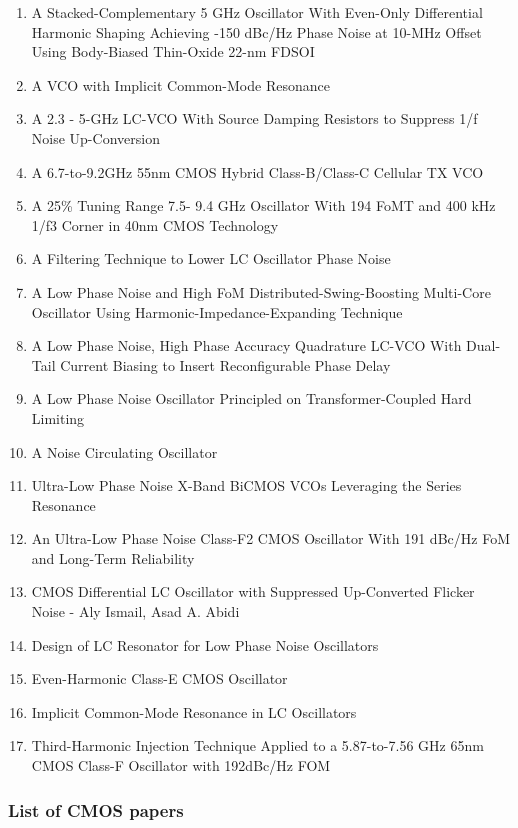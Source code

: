 \begin{enumerate}
	\item A Stacked-Complementary 5 GHz Oscillator With Even-Only Differential Harmonic Shaping Achieving -150 dBc/Hz Phase Noise at 10-MHz Offset Using Body-Biased Thin-Oxide 22-nm FDSOI
	\item A VCO with Implicit Common-Mode Resonance
	\item A 2.3 - 5-GHz LC-VCO With Source Damping Resistors to Suppress 1/f Noise Up-Conversion
	\item A 6.7-to-9.2GHz 55nm CMOS Hybrid Class-B/Class-C Cellular TX VCO
	\item A 25\% Tuning Range 7.5- 9.4 GHz Oscillator With 194 FoMT and 400 kHz 1/f3 Corner in 40nm CMOS Technology
	\item A Filtering Technique to Lower LC Oscillator Phase Noise
	\item A Low Phase Noise and High FoM Distributed-Swing-Boosting Multi-Core Oscillator Using Harmonic-Impedance-Expanding Technique
	\item A Low Phase Noise, High Phase Accuracy Quadrature LC-VCO With Dual-Tail Current Biasing to Insert Reconfigurable Phase Delay
	\item A Low Phase Noise Oscillator Principled on Transformer-Coupled Hard Limiting
	\item A Noise Circulating Oscillator
	\item Ultra-Low Phase Noise X-Band BiCMOS VCOs Leveraging the Series Resonance
	\item An Ultra-Low Phase Noise Class-F2 CMOS Oscillator With 191 dBc/Hz FoM and Long-Term Reliability
	\item CMOS Differential LC Oscillator with Suppressed Up-Converted Flicker Noise - Aly Ismail, Asad A. Abidi
	\item Design of LC Resonator for Low Phase Noise Oscillators
	\item Even-Harmonic Class-E CMOS Oscillator
	\item Implicit Common-Mode Resonance in LC Oscillators
	\item Third-Harmonic Injection Technique Applied to a 5.87-to-7.56 GHz 65nm CMOS Class-F Oscillator with 192dBc/Hz FOM
\end{enumerate}


\subsubsection*{List of CMOS papers}

